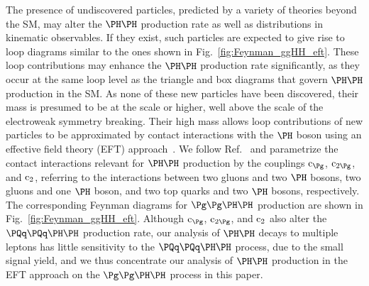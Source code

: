 The presence of undiscovered particles, predicted by a variety of theories beyond the SM, may alter the $\HH$ production rate
as well as distributions in kinematic observables.
If they exist, such particles are expected to give rise to loop diagrams similar to the ones shown in Fig.~\ref{fig:Feynman_ggHH_eft}.
These loop contributions may enhance the $\HH$ production rate significantly,
as they occur at the same loop level as the triangle and box diagrams that govern $\HH$ production in the SM.
As none of these new particles have been discovered, their mass is presumed to be at the \TeV scale or higher,
well above the scale of the electroweak symmetry breaking.
Their high mass allows loop contributions of new particles to be approximated by contact interactions with the $\PHiggs$ boson
using an effective field theory (EFT) approach~\cite{Buchmuller:1985jz,Grzadkowski:2010es}.
We follow Ref.~\cite{Carvalho:2015ttv} and parametrize the contact interactions relevant for $\HH$ production by the couplings $\cg$, $\cgg$, and $\text{c}_{2}$,
referring to the interactions between two gluons and two $\PHiggs$ bosons, two gluons and one $\PHiggs$ boson, 
and two top quarks and two $\PHiggs$ bosons, respectively.
The corresponding Feynman diagrams for $\ggHH$ production are shown in Fig.~\ref{fig:Feynman_ggHH_eft}.
Although $\cg$, $\cgg$, and $\text{c}_{2}$ also alter the $\qqHH$ production rate,
our analysis of $\HH$ decays to multiple leptons
has little sensitivity to the $\qqHH$ process, due to the small signal yield, 
and we thus concentrate our analysis of $\HH$ production in the EFT approach on the $\ggHH$ process in this paper.

